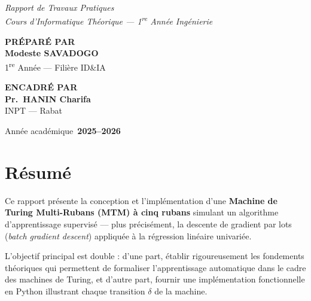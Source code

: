 \documentclass[12pt, a4paper, oneside]{report}
\begin{document}
\begin{titlepage}
\vspace{0.9cm}
{\large\itshape\color{gray!80}
  Rapport de Travaux Pratiques\\[0.18cm]
  Cours d'Informatique Théorique --- 1\textsuperscript{re} Année Ingénierie}

\vfill

\begin{minipage}[t]{0.46\textwidth}\centering
  {\footnotesize\bfseries\color{gray!70} PRÉPARÉ PAR}\\[9pt]
  {\large\bfseries\color{inptblue} Modeste SAVADOGO}\\[3pt]
  {\small\color{gray} 1\textsuperscript{re} Année --- Filière ID\&IA}
\end{minipage}\hfill
\begin{minipage}[t]{0.46\textwidth}\centering
  {\footnotesize\bfseries\color{gray!70} ENCADRÉ PAR}\\[9pt]
  {\large\bfseries\color{inptblue} Pr.~HANIN Charifa}\\[3pt]
  {\small\color{gray} INPT --- Rabat}
\end{minipage}

\vfill

{\small\color{gray!80} Année académique~\textbf{2025--2026}}
\vspace*{0.5cm}

\restoregeometry
\end{titlepage}

\chapter*{Résumé}

Ce rapport présente la conception et l'implémentation d'une \textbf{Machine de Turing Multi-Rubans (MTM) à cinq rubans} simulant un algorithme d'apprentissage supervisé — plus précisément, la descente de gradient par lots (\textit{batch gradient descent}) appliquée à la régression linéaire univariée.

L'objectif principal est double : d'une part, établir rigoureusement les fondements théoriques qui permettent de formaliser l'apprentissage automatique dans le cadre des machines de Turing, et d'autre part, fournir une implémentation fonctionnelle en Python illustrant chaque transition $\delta$ de la machine.
\end{document}
